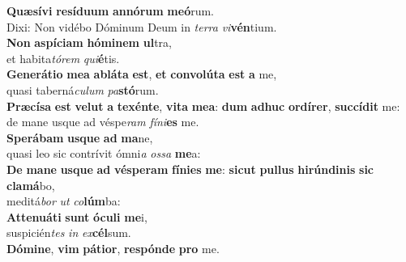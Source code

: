 \evenverse \textbf{Quæ}\textbf{sí}\textbf{vi} \textbf{re}\textbf{sí}\textbf{du}\textbf{um} \textbf{an}\textbf{nó}\textbf{rum} \textbf{me}\textbf{ó}rum.~\*\\
\evenverse Dixi: Non vidébo Dóminum Deum in \textit{ter}\textit{ra} \textit{vi}\textbf{vén}tium.\\
\oddverse \textbf{Non} \textbf{a}\textbf{spí}\textbf{ci}\textbf{am} \textbf{hó}\textbf{mi}\textbf{nem} \textbf{ul}tra,~\*\\
\oddverse et habita\textit{tó}\textit{rem} \textit{qui}\textbf{é}tis.\\
\evenverse \textbf{Ge}\textbf{ne}\textbf{rá}\textbf{ti}\textbf{o} \textbf{me}\textbf{a} \textbf{a}\textbf{blá}\textbf{ta} \textbf{est}, \textbf{et} \textbf{con}\textbf{vo}\textbf{lú}\textbf{ta} \textbf{est} \textbf{a} me,~\*\\
\evenverse quasi taberná\textit{cu}\textit{lum} \textit{pa}\textbf{stó}rum.\\
\oddverse \textbf{Præ}\textbf{cí}\textbf{sa} \textbf{est} \textbf{ve}\textbf{lut} \textbf{a} \textbf{te}\textbf{xén}\textbf{te}, \textbf{vi}\textbf{ta} \textbf{me}\textbf{a}: \textbf{dum} \textbf{a}\textbf{dhuc} \textbf{or}\textbf{dí}\textbf{rer}, \textbf{suc}\textbf{cí}\textbf{dit} me:~\*\\
\oddverse de mane usque ad véspe\textit{ram} \textit{fí}\textit{ni}\textbf{es} me.\\
\evenverse \textbf{Spe}\textbf{rá}\textbf{bam} \textbf{us}\textbf{que} \textbf{ad} \textbf{ma}ne,~\*\\
\evenverse quasi leo sic contrívit ómni\textit{a} \textit{os}\textit{sa} \textbf{me}a:\\
\oddverse \textbf{De} \textbf{ma}\textbf{ne} \textbf{us}\textbf{que} \textbf{ad} \textbf{vé}\textbf{spe}\textbf{ram} \textbf{fí}\textbf{ni}\textbf{es} \textbf{me}: \textbf{si}\textbf{cut} \textbf{pul}\textbf{lus} \textbf{hi}\textbf{rún}\textbf{di}\textbf{nis} \textbf{sic} \textbf{cla}\textbf{má}bo,~\*\\
\oddverse meditá\textit{bor} \textit{ut} \textit{co}\textbf{lúm}ba:\\
\evenverse \textbf{At}\textbf{te}\textbf{nu}\textbf{á}\textbf{ti} \textbf{sunt} \textbf{ó}\textbf{cu}\textbf{li} \textbf{me}i,~\*\\
\evenverse suspicién\textit{tes} \textit{in} \textit{ex}\textbf{cél}sum.\\
\oddverse \textbf{Dó}\textbf{mi}\textbf{ne}, \textbf{vim} \textbf{pá}\textbf{ti}\textbf{or}, \textbf{re}\textbf{spón}\textbf{de} \textbf{pro} me.~\*\\
